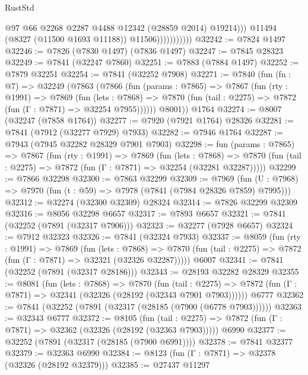 \begin{lexlean}{RustStd}
\begin{coremodule}
{\begin{coremodule}
{{{{{{{{{{{{{{{{{{{{{{{{{{{{{{{{{{{{{{{{{{{{{{{{{{{{{{                                @97
                                @66
                                @2268
                                @2287
                                @4488
                                @12342
                                (@28859 @2014)
                                @19214)))
                          @11494
                          (@8327 (@11500 @1693 @11188))
                          @11506)))))))))))
@32242 := @7824 @1497
@32246 := @7826 (@7830 @1497) (@7836 @1497)
@32247 := @7845 @28323
@32249 := @7841 (@32247 @7860)
@32251 := @7883 (@7884 @1497)
@32252 := @7879 @32251
@32254 := @7841 (@32252 @7908)
@32271 := @7840
    (fun (fn : @7) =>
    @32249
      (@7863
        (@7866
          (fun (params : @7865) =>
          @7867
            (fun (rty : @1991) =>
            @7869
              (fun (lets : @7868) =>
              @7870 (fun (tail : @2275) => @7872 (fun (Γ : @7871) => @32254 @7955))))))
        @8001))
    @1764
@32274 := @8007 (@32247 (@7858 @1764))
@32277 := @7920 (@7921 @1764) @28326
@32281 := @7841 (@7912 (@32277 @7929) @7933)
@32282 := @7946 @1764
@32287 := @7943 (@7945 @32282 @28329 @7901 @7903)
@32298 := fun (params : @7865) =>
  @7867
    (fun (rty : @1991) =>
    @7869
      (fun (lets : @7868) =>
      @7870 (fun (tail : @2275) => @7872 (fun (Γ : @7871) => @32254 (@32281 @32287)))))
@32299 := @7866 @32298
@32300 := @7863 @32299
@32309 := @7969
    (fun (U : @7968) => @7970 (fun (t : @59) => @7978 (@7841 (@7984 @28326 @7859) @7995)))
@32312 := @32274 (@32300 @32309) @28324
@32314 := @7826 @32299 @32309
@32316 := @8056 @32298 @6657
@32317 := @7893 @6657
@32321 := @7841 (@32252 (@7891 (@32317 @7906)))
@32323 := @32277 (@7928 @6657)
@32324 := @7912 @32323
@32326 := @7841 (@32324 @7933)
@32337 := @8059
    (fun (rty : @1991) =>
    @7869
      (fun (lets : @7868) =>
      @7870 (fun (tail : @2275) => @7872 (fun (Γ : @7871) => @32321 (@32326 @32287)))))
    @6007
@32341 := @7841 (@32252 (@7891 (@32317 @28186)))
@32343 := @28193 @32282 @28329
@32355 := @8081
    (fun (lets : @7868) =>
    @7870
      (fun (tail : @2275) =>
      @7872 (fun (Γ : @7871) => @32341 (@32326 (@28192 (@32343 @7901 @7903))))))
    @6777
@32362 := @7841 (@32252 (@7891 (@32317 (@28185 (@7900 (@6778 @7903))))))
@32363 := @32343 @6777
@32372 := @8105
    (fun (tail : @2275) => @7872 (fun (Γ : @7871) => @32362 (@32326 (@28192 (@32363 @7903)))))
    @6990
@32377 := @32252 (@7891 (@32317 (@28185 (@7900 @6991))))
@32378 := @7841 @32377
@32379 := @32363 @6990
@32384 := @8123 (fun (Γ : @7871) => @32378 (@32326 (@28192 @32379)))
@32385 := @27437 @11297
}}}}}}}}}}}}}}}}}}}}}}}}}}}}}}}}}}}}}}}}}}}}}}}}}}}}}}
\end{coremodule}}
\end{coremodule}
\end{lexlean}
